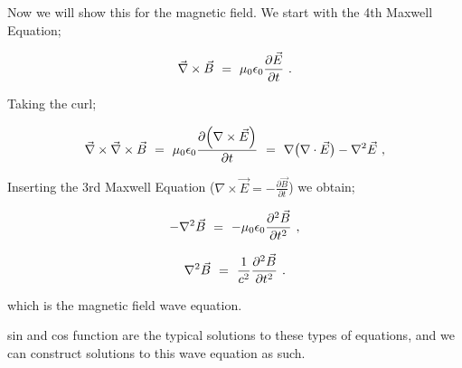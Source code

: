 \documentclass{article}
\begin{document}
Now we will show this for the magnetic field. We start with the 4th Maxwell Equation;

\begin{equation} \label{eq:1002}
\vec{\nabla}\times\vec{B} \hspace{0.125cm} = \hspace{0.125cm} \mu_{0} \epsilon_{0} \frac{\partial{\vec{E}}}{\partial{t}} \hspace{0.125cm} .
\end{equation}

Taking the curl;

\begin{equation} \label{eq:1002}
\vec{\nabla}\times\vec{\nabla}\times\vec{B} \hspace{0.125cm} = \hspace{0.125cm} \mu_{0} \epsilon_{0} \frac{\partial{\Big(\nabla\times\vec{E}\Big)}}{\partial{t}} \hspace{0.125cm} = \hspace{0.125cm} \nabla\big(\nabla\cdot\vec{E}\big) - \nabla^{2}\vec{E} \hspace{0.125cm} ,
\end{equation}

Inserting the 3rd Maxwell Equation (\begin{math} \nabla\times\vec{E} = - \frac{\partial{\vec{B}}}{\partial{t}} \end{math}) we obtain;

\begin{equation} \label{eq:1002}
-\nabla^{2}\vec{B} \hspace{0.125cm} = \hspace{0.125cm} - \mu_{0} \epsilon_{0} \frac{\partial^{2}\vec{B}}{\partial{t}^{2}}  \hspace{0.125cm} ,
\end{equation}

\begin{equation} \label{eq:1002}
\nabla^{2}\vec{B} \hspace{0.125cm} = \hspace{0.125cm} \frac{1}{c^2} \frac{\partial^{2}\vec{B}}{\partial{t}^{2}}  \hspace{0.125cm} .
\end{equation}

which is the magnetic field wave equation. 

sin and cos function are the typical solutions to these types of equations, and we can construct solutions to this wave equation as such. 
\end{document}
